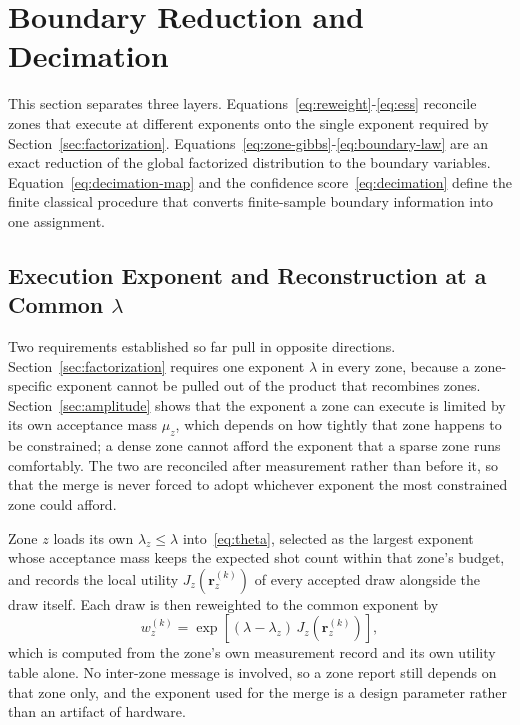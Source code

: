 \documentclass[journal]{IEEEtran}
\begin{document}
\section{Boundary Reduction and Decimation}
\label{sec:hybrid}

This section separates three layers. Equations~\eqref{eq:reweight}-\eqref{eq:ess} reconcile zones that execute at different exponents onto the single exponent required by Section~\ref{sec:factorization}. Equations~\eqref{eq:zone-gibbs}-\eqref{eq:boundary-law} are an exact reduction of the global factorized distribution to the boundary variables. Equation~\eqref{eq:decimation-map} and the confidence score~\eqref{eq:decimation} define the finite classical procedure that converts finite-sample boundary information into one assignment.

\subsection{Execution Exponent and Reconstruction at a Common $\lambda$}
\label{sec:reweighting}

Two requirements established so far pull in opposite directions. Section~\ref{sec:factorization} requires one exponent $\lambda$ in every zone, because a zone-specific exponent cannot be pulled out of the product that recombines zones. Section~\ref{sec:amplitude} shows that the exponent a zone can execute is limited by its own acceptance mass $\mu_z$, which depends on how tightly that zone happens to be constrained; a dense zone cannot afford the exponent that a sparse zone runs comfortably. The two are reconciled after measurement rather than before it, so that the merge is never forced to adopt whichever exponent the most constrained zone could afford.

Zone $z$ loads its own $\lambda_z\le\lambda$ into~\eqref{eq:theta}, selected as the largest exponent whose acceptance mass keeps the expected shot count within that zone's budget, and records the local utility $J_z(\bm r_z^{(k)})$ of every accepted draw alongside the draw itself. Each draw is then reweighted to the common exponent by
\begin{equation}
\label{eq:reweight}
w_z^{(k)}
=\exp\!\left[(\lambda-\lambda_z)\,J_z\!\left(\bm r_z^{(k)}\right)\right],
\end{equation}
which is computed from the zone's own measurement record and its own utility table alone. No inter-zone message is involved, so a zone report still depends on that zone only, and the exponent used for the merge is a design parameter rather than an artifact of hardware.
\end{document}
